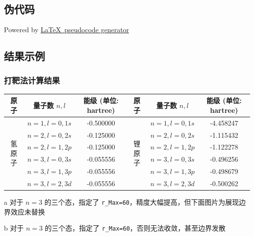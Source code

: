 \subsection{伪代码}
Powered by \href{https://chatgpt.com/g/g-xJJAA2awf-latex-pseudocode-generator}{\LaTeX \ pseudocode generator}


\subsection{结果示例}
\subsubsection{打靶法计算结果}
\begin{threeparttable}
    \begin{tabular}{|c|c|c|c|c|c|}
    \hline
    原子 & 量子数 \(n, l\) & 能级 (单位: hartree) & 原子 & 量子数 \(n, l\) & 能级 (单位: hartree) \\ \hline
    \multirow{6}{*}{氢原子} & \(n=1, l=0, 1s\) & -0.500000 & \multirow{6}{*}{锂原子} & \(n=1, l=0, 1s\) & -4.458247 \\ \cline{2-3} \cline{5-6}
                            & \(n=2, l=0, 2s\) & -0.125000 &                      & \(n=2, l=0, 2s\) & -1.115432 \\ \cline{2-3} \cline{5-6}
                            & \(n=2, l=1, 2p\) & -0.125000 &                      & \(n=2, l=1, 2p\) & -1.122278 \\ \cline{2-3} \cline{5-6}
                            & \(n=3, l=0, 3s\) & -0.055556 &                      & \(n=3, l=0, 3s\) & -0.496256\tnote{b} \\ \cline{2-3} \cline{5-6}
                            & \(n=3, l=1, 3p\) & -0.055556\tnote{a} &                      & \(n=3, l=1, 3p\) & -0.498679 \\ \cline{2-3} \cline{5-6}
                            & \(n=3, l=2, 3d\) & -0.055556 &                      & \(n=3, l=2, 3d\) & -0.500262 \\ \hline
    \end{tabular}
    \begin{tablenotes}
        \item[a] 对于 \(n=3\) 的三个态，指定了 \texttt{r\_Max=60}，精度大幅提高，但下面图片为展现边界效应未替换

    \item[b] 对于 \(n=3\) 的三个态，指定了 \texttt{r\_Max=60}，否则无法收敛，甚至边界发散
    \end{tablenotes}
    \end{threeparttable}
